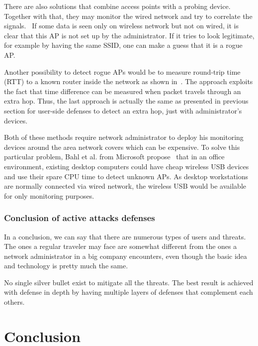 \documentclass[12pt,a4paper,oneside,pdftex]{report}
\begin{document}
There are also solutions that combine access points with a probing device. Together with that, they may monitor the wired network and try to correlate the signals.~\cite{proxim_rogue_ap} If some data is seen only on wireless network but not on wired, it is clear that this AP is not set up by the administrator. If it tries to look legitimate, for example by having the same SSID, one can make a guess that it is a rogue AP.

Another possibility to detect rogue APs would be to measure round-trip time (RTT) to a known router inside the network as shown in~\cite{watkins2007passive}. The approach exploits the fact that time difference can be measured when packet travels through an extra hop. Thus, the last approach is actually the same as presented in previous section for user-side defenses to detect an extra hop, just with administrator's devices.

Both of these methods require network administrator to deploy his monitoring devices around the area network covers which can be expensive. To solve this particular problem, Bahl et al. from Microsoft propose~\cite{bahl2005dair} that in an office environment, existing desktop computers could have cheap wireless USB devices and use their spare CPU time to detect unknown APs. As desktop workstations are normally connected via wired network, the wireless USB would be available for only monitoring purposes.

\subsection{Conclusion of active attacks defenses}

In a conclusion, we can say that there are numerous types of users and threats. The ones a regular traveler may face are somewhat different from the ones a network administrator in a big company encounters, even though the basic idea and technology is pretty much the same.

No single silver bullet exist to mitigate all the threats. The best result is achieved with defense in depth by having multiple layers of defenses that complement each others. 




\chapter{Conclusion}
\label{chapter:conclusion}
\end{document}
